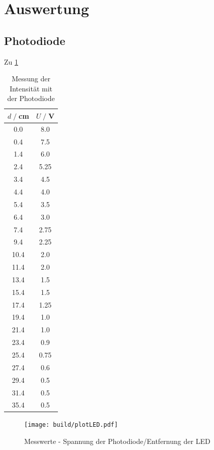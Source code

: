 \newpage
\section{Auswertung}
\label{sec:Auswertung}
\subsection{Photodiode}
Zu \ref{fig:plotLED}\\

\begin{table}
    \centering
    \begin{tabular}{c c}
        \toprule
        $d\;/\;$cm & $U\;/\;$V\\
        \midrule
        0.0 & 8.0 \\ 
        0.4 & 7.5 \\ 
        1.4 & 6.0 \\ 
        2.4 & 5.25 \\ 
        3.4 & 4.5 \\ 
        4.4 & 4.0 \\ 
        5.4 & 3.5 \\ 
        6.4 & 3.0 \\ 
        7.4 & 2.75 \\ 
        9.4 & 2.25 \\ 
        10.4 & 2.0 \\ 
        11.4 & 2.0 \\ 
        13.4 & 1.5 \\ 
        15.4 & 1.5 \\ 
        17.4 & 1.25 \\ 
        19.4 & 1.0 \\ 
        21.4 & 1.0 \\ 
        23.4 & 0.9 \\ 
        25.4 & 0.75 \\ 
        27.4 & 0.6 \\ 
        29.4 & 0.5 \\ 
        31.4 & 0.5 \\ 
        35.4 & 0.5 \\ 
        \bottomrule
    \end{tabular}
    \caption{Messung der Intensität mit der Photodiode}
    \label{tab:LED_werte}
\end{table}

\begin{figure}
    \centering
    \texttt{[image: build/plotLED.pdf]}
    \caption{Messwerte - Spannung der Photodiode/Entfernung der LED}        
    \label{fig:plotLED}
\end{figure}

